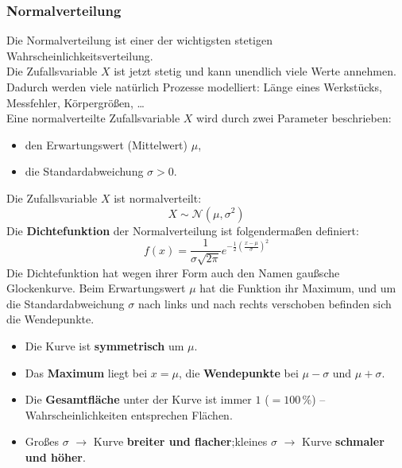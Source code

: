 \subsubsection{Normalverteilung}
Die Normalverteilung ist einer der wichtigsten stetigen Wahrscheinlichkeitsverteilung. \\
Die Zufallsvariable $X$ ist jetzt stetig und kann unendlich viele Werte annehmen. Dadurch werden viele natürlich Prozesse modelliert: Länge eines Werkstücks, Messfehler, Körpergrößen, \dots \\
Eine normalverteilte Zufallsvariable $X$ wird durch zwei Parameter beschrieben:
\begin{itemize}
  \item den Erwartungswert (Mittelwert) $\mu$,
  \item die Standardabweichung $\sigma > 0$.
\end{itemize}
Die Zufallsvariable $X$ ist normalverteilt:
\begin{equation}
    X \sim \mathcal{N}(\mu,\sigma^2)
\end{equation}
Die \textbf{Dichtefunktion} der Normalverteilung ist folgendermaßen definiert:
\begin{equation}
    f(x) = \frac{1}{\sigma\sqrt{2\pi}} e^{-\frac{1}{2}\left(\frac{x-\mu}{\sigma}\right)^2}
\end{equation}
Die Dichtefunktion hat wegen ihrer Form auch den Namen gaußsche Glockenkurve. Beim Erwartungswert $\mu$ hat die Funktion ihr Maximum, und um die Standardabweichung $\sigma$ nach links und nach rechts verschoben befinden sich die Wendepunkte.
\begin{itemize}
    \item Die Kurve ist \textbf{symmetrisch} um $\mu$.
    \item Das \textbf{Maximum} liegt bei $x = \mu$, die \textbf{Wendepunkte} bei $\mu - \sigma$ und $\mu + \sigma$.
    \item Die \textbf{Gesamtfläche} unter der Kurve ist immer $1$ ($=100\,\%$) -- Wahrscheinlichkeiten entsprechen Flächen.
    \item Großes $\sigma$ $\to$ Kurve \textbf{breiter und flacher};\quad kleines $\sigma$ $\to$ Kurve \textbf{schmaler und höher}.
\end{itemize}

\makeatletter

